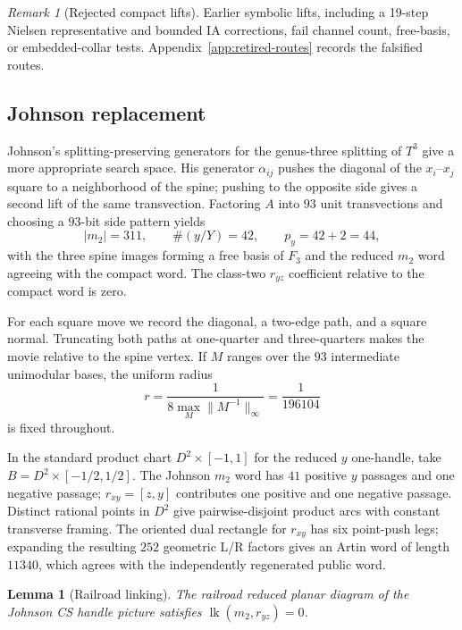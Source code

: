 \documentclass[11pt]{amsart}
\newtheorem{lemma}[theorem]{Lemma}
\theoremstyle{definition}
\theoremstyle{remark}
\newtheorem{remark}[theorem]{Remark}
\begin{document}
\begin{remark}[Rejected compact lifts]
Earlier symbolic lifts, including a 19-step Nielsen representative and
bounded IA corrections, fail channel count, free-basis, or embedded-collar
tests.  Appendix~\ref{app:retired-routes} records the falsified routes.
\end{remark}

\subsection{Johnson replacement}

Johnson's splitting-preserving generators for the genus-three splitting of
$T^3$ \cite{Johnson2011} give a more appropriate search space.  His generator
$\alpha_{ij}$ pushes the diagonal of the $x_i$--$x_j$ square to a
neighborhood of the spine; pushing to the opposite side gives a second lift of
the same transvection.  Factoring $A$ into $93$ unit transvections and choosing
a $93$-bit side pattern yields
\[
|m_2|=311,\qquad \#(y/Y)=42,\qquad p_y=42+2=44,
\]
with the three spine images forming a free basis of $F_3$ and the reduced
$m_2$ word agreeing with the compact word.  The class-two $r_{yz}$ coefficient
relative to the compact word is zero.

For each square move we record the diagonal, a two-edge path, and a square
normal.  Truncating both paths at one-quarter and three-quarters makes the
movie relative to the spine vertex.  If $M$ ranges over the $93$ intermediate
unimodular bases, the uniform radius
\[
r=\frac{1}{8\max_M\lVert M^{-1}\rVert_\infty}=\frac1{196104}
\]
is fixed throughout.

In the standard product chart $D^2\times[-1,1]$ for the reduced $y$
one-handle, take $B=D^2\times[-1/2,1/2]$.  The Johnson $m_2$ word has $41$
positive $y$ passages and one negative passage; $r_{xy}=[z,y]$ contributes one
positive and one negative passage.  Distinct rational points in $D^2$ give
pairwise-disjoint product arcs with constant transverse framing.  The oriented
dual rectangle for $r_{xy}$ has six point-push legs; expanding the resulting
$252$ geometric L/R factors gives an Artin word of length $11340$, which
agrees with the independently regenerated public word.

\begin{lemma}[Railroad linking]\label{lem:P0d-link}
The railroad reduced planar diagram of the Johnson CS handle picture satisfies
$\operatorname{lk}(m_2,r_{yz})=0$.
\end{lemma}
\end{document}
